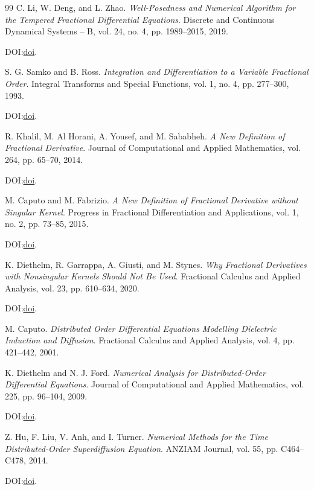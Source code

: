 \documentclass[11pt]{article}
\begin{document}
\begin{thebibliography}{99}
C. Li, W. Deng, and L. Zhao.
\emph{Well-Posedness and Numerical Algorithm for the Tempered Fractional
Differential Equations}.
Discrete and Continuous Dynamical Systems -- B, vol. 24, no. 4,
pp. 1989--2015, 2019.
\par\noindent DOI:\@ \href{https://doi.org/10.3934/dcdsb.2019026}{doi}.

S. G. Samko and B. Ross.
\emph{Integration and Differentiation to a Variable Fractional Order}.
Integral Transforms and Special Functions, vol. 1, no. 4, pp. 277--300, 1993.
\par\noindent DOI:\@ \href{https://doi.org/10.1080/10652469308819027}{doi}.

R. Khalil, M. Al Horani, A. Yousef, and M. Sababheh.
\emph{A New Definition of Fractional Derivative}.
Journal of Computational and Applied Mathematics, vol. 264, pp. 65--70, 2014.
\par\noindent DOI:\@ \href{https://doi.org/10.1016/j.cam.2014.01.002}{doi}.

M. Caputo and M. Fabrizio.
\emph{A New Definition of Fractional Derivative without Singular Kernel}.
Progress in Fractional Differentiation and Applications, vol. 1, no. 2,
pp. 73--85, 2015.
\par\noindent DOI:\@ \href{https://doi.org/10.12785/pfda/010201}{doi}.

K. Diethelm, R. Garrappa, A. Giusti, and M. Stynes.
\emph{Why Fractional Derivatives with Nonsingular Kernels Should Not Be Used}.
Fractional Calculus and Applied Analysis, vol. 23, pp. 610--634, 2020.
\par\noindent DOI:\@ \href{https://doi.org/10.1515/fca-2020-0032}{doi}.

M. Caputo.
\emph{Distributed Order Differential Equations Modelling Dielectric Induction and Diffusion}.
Fractional Calculus and Applied Analysis, vol. 4, pp. 421--442, 2001.

K. Diethelm and N. J. Ford.
\emph{Numerical Analysis for Distributed-Order Differential Equations}.
Journal of Computational and Applied Mathematics, vol. 225, pp. 96--104, 2009.
\par\noindent DOI:\@ \href{https://doi.org/10.1016/j.cam.2008.07.018}{doi}.

Z. Hu, F. Liu, V. Anh, and I. Turner.
\emph{Numerical Methods for the Time Distributed-Order Superdiffusion Equation}.
ANZIAM Journal, vol. 55, pp. C464--C478, 2014.
\par\noindent DOI:\@ \href{https://doi.org/10.21914/ANZIAMJ.V55I0.7888}{doi}.


\end{thebibliography}
\end{document}
